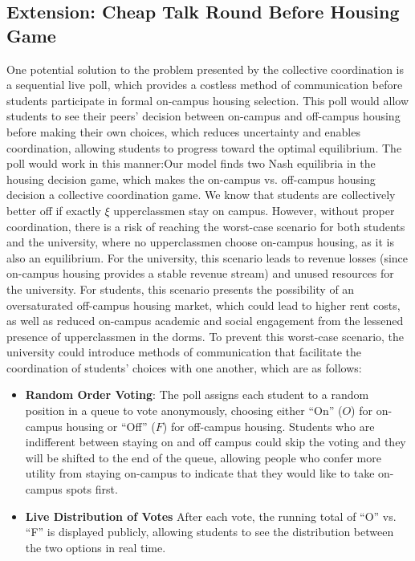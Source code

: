 \documentclass[12pt]{article}
\begin{document}
\subsection{Extension: Cheap Talk Round Before Housing Game}
One potential solution to the problem presented by the collective coordination is a sequential live poll, which provides a costless method of communication before students participate in formal on-campus housing selection. This poll would allow students to see their peers’ decision between on-campus and off-campus housing before making their own choices, which reduces uncertainty and enables coordination, allowing students to progress toward the optimal equilibrium. The poll would work in this manner:Our model finds two Nash equilibria in the housing decision game, which makes the on-campus vs. off-campus housing decision a collective coordination game. We know that students are collectively better off if exactly $\xi$ upperclassmen stay on campus. However, without proper coordination, there is a risk of reaching the worst-case scenario for both students and the university, where no upperclassmen choose on-campus housing, as it is also an equilibrium. For the university, this scenario leads to revenue losses (since on-campus housing provides a stable revenue stream) and unused resources for the university. For students, this scenario presents the possibility of an oversaturated off-campus housing market, which could lead to higher rent costs, as well as reduced on-campus academic and social engagement from the lessened presence of upperclassmen in the dorms. To prevent this worst-case scenario, the university could introduce methods of communication that facilitate the coordination of students’ choices with one another, which are as follows:
\begin{itemize}
    \item \textbf{Random Order Voting}: The poll assigns each student to a random position in a queue to vote anonymously, choosing either “On” ($O$) for on-campus housing or “Off” ($F$) for off-campus housing.  Students who are indifferent between staying on and off campus could skip the voting and they will be shifted to the end of the queue, allowing people who confer more utility from staying on-campus to indicate that they would like to take on-campus spots first.
    \item \textbf{Live Distribution of Votes} After each vote, the running total of “O” vs. “F” is displayed publicly, allowing students to see the distribution between the two options in real time.
\end{itemize}
\end{document}
